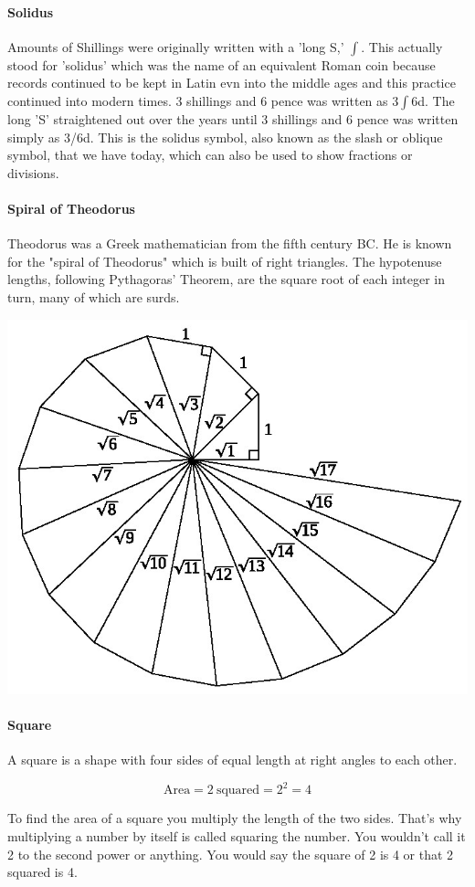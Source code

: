 \documentclass[12pt]{article}
\begin{document}
\paragraph{Solidus}
Amounts of Shillings were originally written with a 'long S,' $\int$. This actually stood for 'solidus' which was the name of an equivalent Roman coin because records continued to be kept in Latin evn into the middle ages and this practice continued into modern times. 3 shillings and 6 pence was written as 3$\int$6d. The long 'S' straightened out over the years until 3 shillings and 6 pence was written simply as 3/6d. This is the solidus symbol, also known as the slash or oblique symbol, that we have today, which can also be used to show fractions or divisions.

\paragraph{Spiral of Theodorus}
Theodorus was a Greek mathematician from the fifth century BC. He is known for the "spiral of Theodorus" which is built of right triangles. The hypotenuse lengths, following Pythagoras' Theorem, are the square root of each integer in turn, many of which are surds.
\begin{center}
\includegraphics[width=\linewidth]{Spiral_of_Theodorus.jpg}
\end{center}

\paragraph{Square}
A square is a shape with four sides of equal length at right angles to each other.
\begin{center}
\[\text{Area} = 2 \ \text{squared} = 2^2 = 4\]
\end{center}
To find the area of a square you multiply the length of the two sides. That's why multiplying a number by itself is called squaring the number. You wouldn't call it 2 to the second power or anything. You would say the square of 2 is 4 or that 2 squared is 4.
\end{document}
